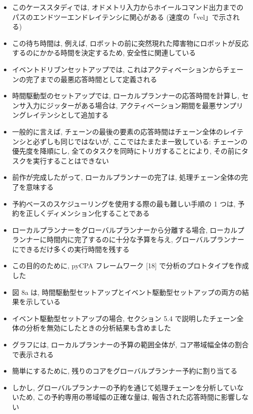\begin{frame}{}
    \begin{itemize}
        \item このケーススタディでは, オドメトリ入力からホイールコマンド出力までのパスのエンドツーエンドレイテンシに関心がある (速度の「vel」で示される)
\item この待ち時間は, 例えば, ロボットの前に突然現れた障害物にロボットが反応するのにかかる時間を決定するため, 安全性に関連している
\item イベントドリブンセットアップでは, これはアクティベーションからチェーンの完了までの最悪応答時間として定義される
\item 時間駆動型のセットアップでは, ローカルプランナーの応答時間を計算し, センサ入力にジッターがある場合は, アクティベーション期間を最悪サンプリングレイテンシとして追加する
\item 一般的に言えば, チェーンの最後の要素の応答時間はチェーン全体のレイテンシと必ずしも同じではないが, ここではたまたま一致している: チェーンの優先度を降順にし, 全てのタスクを同時にトリガすることにより, その前にタスクを実行することはできない
\item 前作が完成したがって, ローカルプランナーの完了は, 処理チェーン全体の完了を意味する
    \end{itemize}
\end{frame}

\begin{frame}{}
    \begin{itemize}
        \item 予約ベースのスケジューリングを使用する際の最も難しい手順の 1 つは, 予約を正しくディメンション化することである
\item ローカルプランナーをグローバルプランナーから分離する場合, ローカルプランナーに時間内に完了するのに十分な予算を与え, グローバルプランナーにできるだけ多くの実行時間を残する
\item この目的のために, pyCPA フレームワーク [18] で分析のプロトタイプを作成した
\item 図 8a は, 時間駆動型セットアップとイベント駆動型セットアップの両方の結果を示している
\item イベント駆動型セットアップの場合, セクション 5.4 で説明したチェーン全体の分析を無効にしたときの分析結果も含めました
\item グラフには, ローカルプランナーの予算の範囲全体が, コア帯域幅全体の割合で表示される
\item 簡単にするために, 残りのコアをグローバルプランナー予約に割り当てる
\item しかし, グローバルプランナーの予約を通じて処理チェーンを分析していないため, この予約専用の帯域幅の正確な量は, 報告された応答時間に影響しない
    \end{itemize}
\end{frame}

